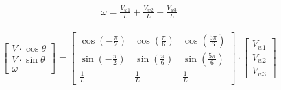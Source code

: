 \begin{equation*}
    \begin{split}
        \omega = 
        \frac{V_{w1}}{L}
        + \frac{V_{w2}}{L}
        + \frac{V_{w3}}{L}
    \end{split}
\end{equation*}

\begin{gather}
	\begin{bmatrix} V\cdot \cos{\theta} \\  V\cdot \sin{\theta} \\  \omega \end{bmatrix}
	=
	\begin{bmatrix}
		\cos{\left(-\frac{\pi}{2}\right)} & \cos{\left(\frac{\pi}{6}\right)} & \cos{\left(\frac{5\pi}{6}\right)} \\
		\sin{\left(-\frac{\pi}{2}\right)} & \sin{\left(\frac{\pi}{6}\right)} & \sin{\left(\frac{5\pi}{6}\right)} \\
		\frac{1}{L} & \frac{1}{L} & \frac{1}{L}
	\end{bmatrix}
	\cdot
	\begin{bmatrix} V_{w1} \\  V_{w2} \\  V_{w3} \end{bmatrix}
\end{gather}


